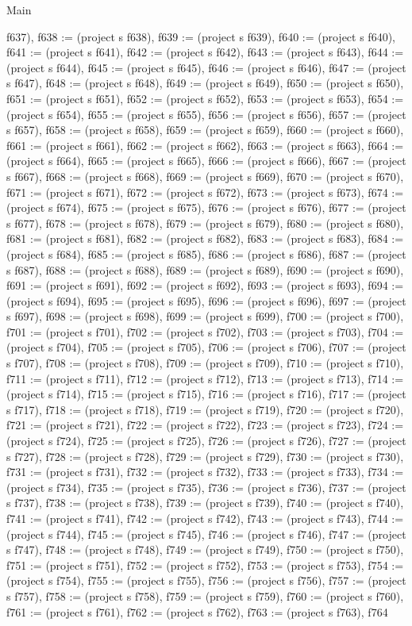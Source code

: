 \begin{lexlean}{Main}
\begin{semanticmodule}
{f637), f638 := (project s f638), f639 := (project s f639), f640 := (project s f640), f641 := (project s f641), f642 := (project s f642), f643 := (project s f643), f644 := (project s f644), f645 := (project s f645), f646 := (project s f646), f647 := (project s f647), f648 := (project s f648), f649 := (project s f649), f650 := (project s f650), f651 := (project s f651), f652 := (project s f652), f653 := (project s f653), f654 := (project s f654), f655 := (project s f655), f656 := (project s f656), f657 := (project s f657), f658 := (project s f658), f659 := (project s f659), f660 := (project s f660), f661 := (project s f661), f662 := (project s f662), f663 := (project s f663), f664 := (project s f664), f665 := (project s f665), f666 := (project s f666), f667 := (project s f667), f668 := (project s f668), f669 := (project s f669), f670 := (project s f670), f671 := (project s f671), f672 := (project s f672), f673 := (project s f673), f674 := (project s f674), f675 := (project s f675), f676 := (project s f676), f677 := (project s f677), f678 := (project s f678), f679 := (project s f679), f680 := (project s f680), f681 := (project s f681), f682 := (project s f682), f683 := (project s f683), f684 := (project s f684), f685 := (project s f685), f686 := (project s f686), f687 := (project s f687), f688 := (project s f688), f689 := (project s f689), f690 := (project s f690), f691 := (project s f691), f692 := (project s f692), f693 := (project s f693), f694 := (project s f694), f695 := (project s f695), f696 := (project s f696), f697 := (project s f697), f698 := (project s f698), f699 := (project s f699), f700 := (project s f700), f701 := (project s f701), f702 := (project s f702), f703 := (project s f703), f704 := (project s f704), f705 := (project s f705), f706 := (project s f706), f707 := (project s f707), f708 := (project s f708), f709 := (project s f709), f710 := (project s f710), f711 := (project s f711), f712 := (project s f712), f713 := (project s f713), f714 := (project s f714), f715 := (project s f715), f716 := (project s f716), f717 := (project s f717), f718 := (project s f718), f719 := (project s f719), f720 := (project s f720), f721 := (project s f721), f722 := (project s f722), f723 := (project s f723), f724 := (project s f724), f725 := (project s f725), f726 := (project s f726), f727 := (project s f727), f728 := (project s f728), f729 := (project s f729), f730 := (project s f730), f731 := (project s f731), f732 := (project s f732), f733 := (project s f733), f734 := (project s f734), f735 := (project s f735), f736 := (project s f736), f737 := (project s f737), f738 := (project s f738), f739 := (project s f739), f740 := (project s f740), f741 := (project s f741), f742 := (project s f742), f743 := (project s f743), f744 := (project s f744), f745 := (project s f745), f746 := (project s f746), f747 := (project s f747), f748 := (project s f748), f749 := (project s f749), f750 := (project s f750), f751 := (project s f751), f752 := (project s f752), f753 := (project s f753), f754 := (project s f754), f755 := (project s f755), f756 := (project s f756), f757 := (project s f757), f758 := (project s f758), f759 := (project s f759), f760 := (project s f760), f761 := (project s f761), f762 := (project s f762), f763 := (project s f763), f764 }
\end{semanticmodule}
\end{lexlean}
